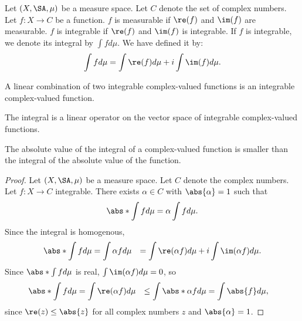 
Let $(X, \SA, \mu)$
be a measure space.
Let $C$ denote the set
of complex numbers.
Let $f: X \to C$
be a function.
$f$ is measurable
if $\re(f)$ and $\im(f)$
are measurable.
$f$ is integrable if
$\re(f)$ and $\im(f)$
is integrable.
If $f$ is integrable,
we denote its integral
by $\int f d\mu$.
We have defined it by:
\[
  \int f d\mu = \int \re(f)d\mu
  + i\int \im(f) d\mu.
\]


\begin{prop}
A linear combination
of two integrable complex-valued
functions is an integrable
complex-valued function.
\end{prop}

\begin{prop}
The integral is a linear
operator on the vector space
of integrable complex-valued
functions.
\end{prop}

\begin{prop}
The absolute value
of the integral of a
complex-valued function
is smaller than the integral
of the absolute value
of the function.

\begin{proof}
Let $(X, \SA, \mu)$
be a measure space.
Let $C$ denote the
complex numbers.
Let $f: X \to C$
integrable.
There exists $\alpha \in C$
with $\abs{\alpha} = 1$
such that
\[
  \abs*{\int f d\mu} = \alpha \int f d\mu.
\]
Since the integral is homogenous,
\[
  \begin{aligned}
  \abs*{\int f d\mu}
  &= \int \alpha f d\mu
  &= \int \re(\alpha f) d\mu + i \int \im(\alpha f)d\mu.
  \end{aligned}
\]
  Since $\abs*{\int f d\mu}$ is real,
  $\int \im(\alpha f) d\mu = 0$,
  so
  \[
  \begin{aligned}
  \abs*{\int f d\mu}
  &= \int \re(\alpha f) d\mu
  &\leq \int \abs*{\alpha f} d\mu
  &= \int \abs{f} d\mu,
  \end{aligned}
  \]
  since $\re(z) \leq \abs{z}$ for all
  complex numbers $z$ and $\abs{\alpha} = 1$.
\end{proof}
\end{prop}
\strats
